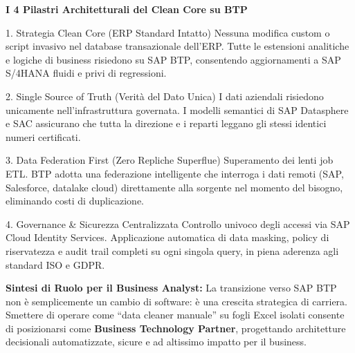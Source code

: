 \documentclass[a4paper,10pt]{extarticle}
\begin{document}
\vspace{10pt}

{\fontsize{10.5}{13}\selectfont\bfseries\color{sapnavy}I 4 Pilastri Architetturali del Clean Core su BTP}
\vspace{3pt}

\begin{tcbraster}[raster columns=2, raster equal height, raster column skip=6pt, raster row skip=5pt]
  \begin{pillarcard}{1. Strategia Clean Core (ERP Standard Intatto)}
    \fontsize{7.3}{9.1}\selectfont
    Nessuna modifica custom o script invasivo nel database transazionale dell'ERP. Tutte le estensioni analitiche e logiche di business risiedono su SAP BTP, consentendo aggiornamenti a SAP S/4HANA fluidi e privi di regressioni.
  \end{pillarcard}
  \begin{pillarcard}{2. Single Source of Truth (Verit\`a del Dato Unica)}
    \fontsize{7.3}{9.1}\selectfont
    I dati aziendali risiedono unicamente nell'infrastruttura governata. I modelli semantici di SAP Datasphere e SAC assicurano che tutta la direzione e i reparti leggano gli stessi identici numeri certificati.
  \end{pillarcard}
  \begin{pillarcard}{3. Data Federation First (Zero Repliche Superflue)}
    \fontsize{7.3}{9.1}\selectfont
    Superamento dei lenti job ETL. BTP adotta una federazione intelligente che interroga i dati remoti (SAP, Salesforce, datalake cloud) direttamente alla sorgente nel momento del bisogno, eliminando costi di duplicazione.
  \end{pillarcard}
  \begin{pillarcard}{4. Governance \& Sicurezza Centralizzata}
    \fontsize{7.3}{9.1}\selectfont
    Controllo univoco degli accessi via SAP Cloud Identity Services. Applicazione automatica di data masking, policy di riservatezza e audit trail completi su ogni singola query, in piena aderenza agli standard ISO e GDPR.
  \end{pillarcard}
\end{tcbraster}

\vspace{10pt}

\begin{tcolorbox}[
  enhanced,
  colback=sapnavy,
  colframe=goldaccent,
  boxrule=0.8pt,
  arc=3.5pt,
  left=10pt, right=10pt, top=6pt, bottom=6pt
]
  \fontsize{7.8}{10}\selectfont\color{white}
  \textbf{\color{goldaccent}Sintesi di Ruolo per il Business Analyst:} La transizione verso SAP BTP non \`e semplicemente un cambio di software: \`e una crescita strategica di carriera. Smettere di operare come ``data cleaner manuale'' su fogli Excel isolati consente di posizionarsi come \textbf{Business Technology Partner}, progettando architetture decisionali automatizzate, sicure e ad altissimo impatto per il business.
\end{tcolorbox}
\end{document}
